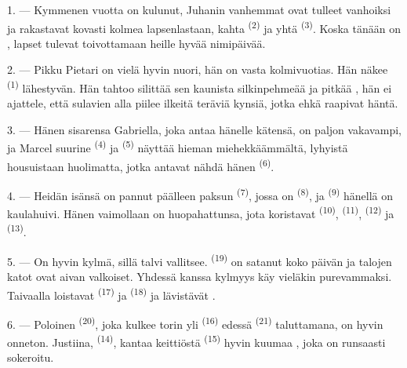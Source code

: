 \VUsaut{3.0mm}

1. --- Kymmenen vuotta on kulunut, Juhanin vanhemmat ovat tulleet vanhoiksi ja
rakastavat kovasti kolmea lapsenlastaan, kahta 
\textsuperscript{(2)} ja yhtä  \textsuperscript{(3)}. Koska
tänään on , lapset tulevat toivottamaan heille
hyvää nimipäivää.

2. --- Pikku Pietari on vielä hyvin nuori, hän on vasta kolmivuotias. Hän näkee
 \textsuperscript{(1)} lähestyvän. Hän tahtoo silittää sen kaunista
silkinpehmeää  ja pitkää , hän ei ajattele, että
sulavien  alla piilee ilkeitä teräviä kynsiä, jotka ehkä
raapivat häntä.

3. --- Hänen sisarensa Gabriella, joka antaa hänelle kätensä, on paljon
vakavampi, ja Marcel suurine  \textsuperscript{(4)} ja
 \textsuperscript{(5)} näyttää hieman miehekkäämmältä,
lyhyistä housuistaan huolimatta, jotka antavat nähdä hänen 
\textsuperscript{(6)}.

4. --- Heidän isänsä on pannut päälleen paksun 
\textsuperscript{(7)}, jossa on  \textsuperscript{(8)}, ja
 \textsuperscript{(9)} hänellä on kaulahuivi. Hänen
vaimollaan on huopahattunsa, jota koristavat 
\textsuperscript{(10)},  \textsuperscript{(11)},
 \textsuperscript{(12)} ja 
\textsuperscript{(13)}.

5. --- On hyvin kylmä, sillä talvi vallitsee. 
\textsuperscript{(19)} on satanut koko päivän ja talojen katot ovat aivan
valkoiset. Yhdessä  kanssa kylmyys käy vieläkin purevammaksi.
Taivaalla loistavat  \textsuperscript{(17)} ja 
\textsuperscript{(18)} ja lävistävät .

\VUsaut{4.2mm}
\VUsaut{3.0mm}

6. --- Poloinen  \textsuperscript{(20)}, joka kulkee torin yli
 \textsuperscript{(16)} edessä 
\textsuperscript{(21)} taluttamana, on hyvin onneton. Justiina,
 \textsuperscript{(14)}, kantaa keittiöstä
 \textsuperscript{(15)} hyvin kuumaa ,
joka on runsaasti sokeroitu.

